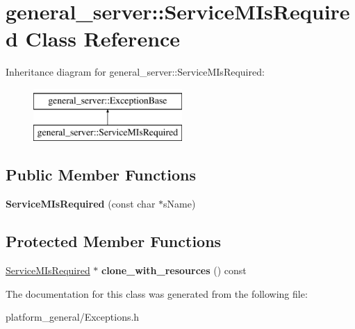 \hypertarget{classgeneral__server_1_1ServiceMIsRequired}{\section{general\-\_\-server\-:\-:\-Service\-M\-Is\-Required \-Class \-Reference}
\label{classgeneral__server_1_1ServiceMIsRequired}
}
\-Inheritance diagram for general\-\_\-server\-:\-:\-Service\-M\-Is\-Required\-:\begin{figure}[H]
\begin{center}
\leavevmode
\includegraphics[height=2.000000cm]{classgeneral__server_1_1ServiceMIsRequired}
\end{center}
\end{figure}
\subsection*{\-Public \-Member \-Functions}
\begin{DoxyCompactItemize}
\item 
\hypertarget{classgeneral__server_1_1ServiceMIsRequired_adfa7fbd0c563ffd45a79632dfa1e0681}{{\bfseries \-Service\-M\-Is\-Required} (const char $\ast$s\-Name)}\label{classgeneral__server_1_1ServiceMIsRequired_adfa7fbd0c563ffd45a79632dfa1e0681}

\end{DoxyCompactItemize}
\subsection*{\-Protected \-Member \-Functions}
\begin{DoxyCompactItemize}
\item 
\hypertarget{classgeneral__server_1_1ServiceMIsRequired_af19cd5a8bec2ff270d0eda9308a5be45}{\hyperlink{classgeneral__server_1_1ServiceMIsRequired}{\-Service\-M\-Is\-Required} $\ast$ {\bfseries clone\-\_\-with\-\_\-resources} () const }\label{classgeneral__server_1_1ServiceMIsRequired_af19cd5a8bec2ff270d0eda9308a5be45}

\end{DoxyCompactItemize}


\-The documentation for this class was generated from the following file\-:\begin{DoxyCompactItemize}
\item 
platform\-\_\-general/\-Exceptions.\-h\end{DoxyCompactItemize}

